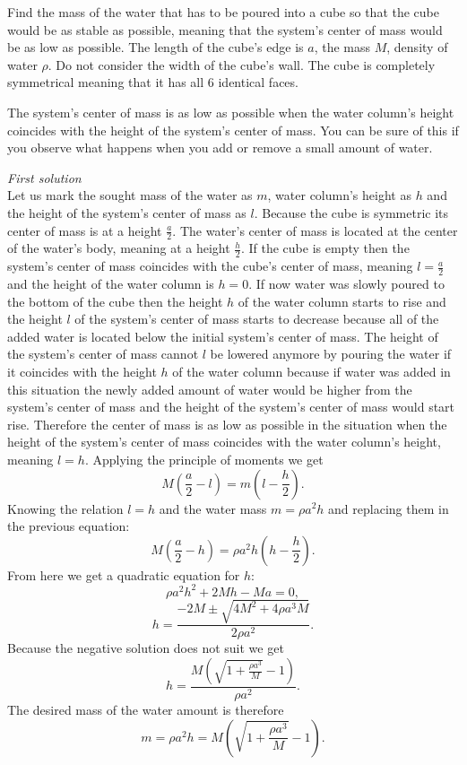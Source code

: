 Find the mass of the water that has to be poured into a cube so that the cube would be as stable as possible, meaning that the system’s center of mass would be as low as possible. The length of the cube’s edge is $a$, the mass $M$, density of water $\rho$. Do not consider the width of the cube’s wall. The cube is completely symmetrical meaning that it has all 6 identical faces.

\hinteng
The system’s center of mass is as low as possible when the water column’s height coincides with the height of the system’s center of mass. You can be sure of this if you observe what happens when you add or remove a small amount of water.

\solueng
\emph{First solution}\\
Let us mark the sought mass of the water as $m$, water column’s height as $h$ and the height of the system’s center of mass as $l$. Because the cube is symmetric its center of mass is at a height $\frac{a}{2}$. The water’s center of mass is located at the center of the water’s body, meaning at a height $\frac{h}{2}$. If the cube is empty then the system’s center of mass coincides with the cube’s center of mass, meaning $l=\frac{a}{2}$ and the height of the water column is $h=0$. If now water was slowly poured to the bottom of the cube then the height $h$ of the water column starts to rise and the height $l$ of the system’s center of mass starts to decrease because all of the added water is located below the initial system’s center of mass. The height of the system’s center of mass cannot $l$ be lowered anymore by pouring the water if it coincides with the height $h$ of the water column because if water was added in this situation the newly added amount of water would be higher from the system’s center of mass and the height of the system’s center of mass would start rise. Therefore the center of mass is as low as possible in the situation when the height of the system’s center of mass coincides with the water column’s height, meaning $l=h$. Applying the principle of moments we get
$$M(\frac{a}{2}-l)=m(l-\frac{h}{2}).$$
Knowing the relation $l=h$ and the water mass $m=\rho a^2h$ and replacing them in the previous equation:
$$M(\frac{a}{2}-h)=\rho a^2h(h-\frac{h}{2}).$$
From here we get a quadratic equation for $h$:
$$\rho a^2h^2+2Mh-Ma=0,$$
$$h=\frac{-2M \pm \sqrt{4M^2+4\rho a^3M}}{2\rho a^2}.$$
Because the negative solution does not suit we get
$$h=\frac{M(\sqrt{1+\frac{\rho a^3}{M}}-1)}{\rho a^2}.$$
The desired mass of the water amount is therefore
$$m=\rho a^2h=M(\sqrt{1+\frac{\rho a^3}{M}}-1).$$

